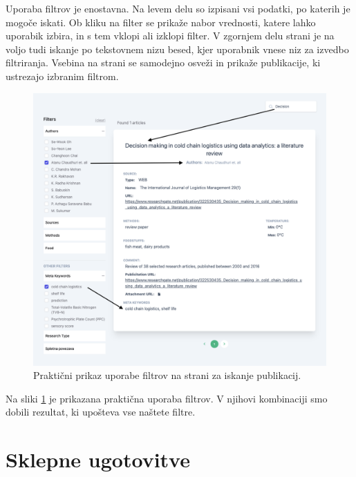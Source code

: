 \documentclass[a4paper, 12pt]{book}
\begin{document}
Uporaba filtrov je enostavna. Na levem delu so izpisani vsi podatki, po katerih je mogoče iskati. Ob kliku na filter se prikaže nabor vrednosti, katere lahko uporabik izbira, in s tem vklopi ali izklopi filter. V zgornjem delu strani je na voljo tudi iskanje po tekstovnem nizu besed, kjer uporabnik vnese niz za izvedbo filtriranja. Vsebina na strani se samodejno osveži in prikaže publikacije, ki ustrezajo izbranim filtrom. 


\begin{figure}[h]
\begin{center}
\includegraphics[width=1\textwidth]{slike/search.png}
\end{center}
\caption{ Praktični prikaz uporabe filtrov na strani za iskanje publikacij. }
\label{seach-example}
\end{figure}

Na sliki \ref{seach-example} je prikazana praktična uporaba filtrov. V njihovi kombinaciji smo dobili rezultat, ki upošteva vse naštete filtre. 


\chapter{Sklepne ugotovitve}
\end{document}
